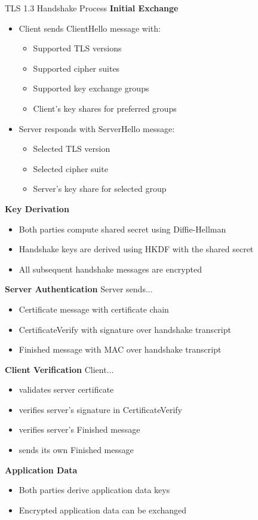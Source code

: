 \begin{KR}{TLS 1.3 Handshake Process}
\textbf{Initial Exchange}
\begin{itemize}
    \item Client sends ClientHello message with:
    \begin{itemize}
        \item Supported TLS versions
        \item Supported cipher suites
        \item Supported key exchange groups
        \item Client's key shares for preferred groups
    \end{itemize}
    \item Server responds with ServerHello message:
    \begin{itemize}
        \item Selected TLS version
        \item Selected cipher suite
        \item Server's key share for selected group
    \end{itemize}
\end{itemize}

\textbf{Key Derivation}
\begin{itemize}
    \item Both parties compute shared secret using Diffie-Hellman
    \item Handshake keys are derived using HKDF with the shared secret
    \item All subsequent handshake messages are encrypted
\end{itemize}

\textbf{Server Authentication} Server sends...
\begin{itemize}
    \item Certificate message with certificate chain
    \item CertificateVerify with signature over handshake transcript
    \item Finished message with MAC over handshake transcript
\end{itemize}

\textbf{Client Verification} Client...
\begin{itemize}
    \item validates server certificate
    \item verifies server's signature in CertificateVerify
    \item verifies server's Finished message
    \item sends its own Finished message
\end{itemize}

\textbf{Application Data}
\begin{itemize}
    \item Both parties derive application data keys
    \item Encrypted application data can be exchanged
\end{itemize}
\end{KR}


